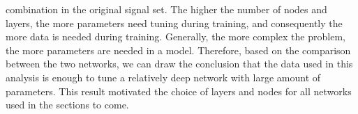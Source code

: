 combination in the original signal set. The higher the number of nodes and layers, the more parameters need tuning during training, 
and consequently the more data is needed during training. Generally, the more complex the problem, the more parameters are needed in a model. Therefore, 
based on the comparison between the two networks, we can draw the conclusion that the data used in this analysis is enough to tune a relatively 
deep network with large amount of parameters. This result motivated the choice of layers and nodes for all networks used in the sections to come.
\begin{figure}
\end{figure}
